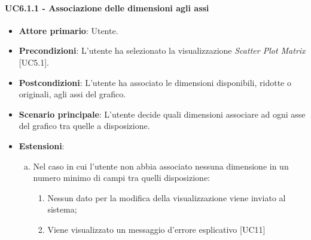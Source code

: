 \paragraph{UC6.1.1 - Associazione delle dimensioni agli assi}
\begin{itemize}
	\item \textbf{Attore primario}: Utente.
	\item \textbf{Precondizioni}: L'utente ha selezionato la visualizzazione \textit{Scatter Plot Matrix} [UC5.1].
	\item \textbf{Postcondizioni}: L'utente ha associato le dimensioni disponibili, ridotte o originali, agli assi del grafico. 
	
	\item \textbf{Scenario principale}: L'utente decide quali dimensioni associare ad ogni asse del grafico tra quelle a disposizione.
	
		\item \textbf{Estensioni}:
	\begin{enumerate}[(a)]
		\item Nel caso in cui l'utente non abbia associato nessuna dimensione in un numero minimo di campi tra quelli disposizione:
		\begin{enumerate}[1.]
			\item Nessun dato per la modifica della visualizzazione viene inviato al sistema;
			\item Viene visualizzato un messaggio d'errore esplicativo [UC11]
		\end{enumerate}
	\end{enumerate}
\end{itemize}